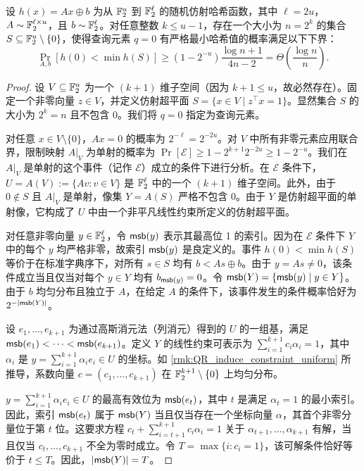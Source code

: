 \begin{theorem}\label{thm:min_wise_random_affine_not_good}
    设 $h(x) = Ax \oplus b$ 为从 $\mathbb{F}_2^u$ 到 $\mathbb{F}_2^\ell$ 的随机仿射哈希函数，其中 $\ell = 2u$，$A \sim \mathbb{F}_2^{\ell \times u}$，且 $b \sim \mathbb{F}_2^\ell$。对任意整数 $k \le u - 1$，存在一个大小为 $n = 2^k$ 的集合 $S \subseteq \mathbb{F}_2^u \setminus \{0\}$，使得查询元素 $q = 0$ 有严格最小哈希值的概率满足以下下界：
    $$
    \Pr_{A,b}[h(0) < \min h(S)] \ge (1 - 2^{-u}) \frac{\log n + 1}{4n - 2} = \Theta\left(\frac{\log n}{n}\right).
    $$
\end{theorem}

\begin{proof}
    设 $V \subseteq \mathbb{F}_2^u$ 为一个 $(k+1)$ 维子空间（因为 $k+1 \le u$，故必然存在）。固定一个非零向量 $z \in V$，并定义仿射超平面 $S = \{ x \in V \mid z^\top x = 1 \}$。显然集合 $S$ 的大小为 $2^k = n$ 且不包含 $0$。我们将 $q = 0$ 指定为查询元素。
    
    对任意 $x \in V \setminus \{0\}$，$Ax = 0$ 的概率为 $2^{-\ell} = 2^{-2u}$。对 $V$ 中所有非零元素应用联合界，限制映射 $A|_V$ 为单射的概率为 $\Pr[\mathcal{E}] \ge 1 - 2^{k+1} 2^{-2u} \ge 1 - 2^{-u}$。我们在 $A|_V$ 是单射的这个事件（记作 $\mathcal{E}$）成立的条件下进行分析。在 $\mathcal{E}$ 条件下，$U = A(V) := \{A v : v \in V\}$ 是 $\mathbb{F}_2^\ell$ 中的一个 $(k+1)$ 维子空间。此外，由于 $0 \notin S$ 且 $A|_V$ 是单射，像集 $Y = A(S)$ 严格不包含 $0$。由于 $Y$ 是仿射超平面的单射像，它构成了 $U$ 中由一个非平凡线性约束所定义的仿射超平面。
    
    对任意非零向量 $y \in \mathbb{F}_2^\ell$，令 $\mathsf{msb}(y)$ 表示其最高位 1 的索引。因为在 $\mathcal{E}$ 条件下 $Y$ 中的每个 $y$ 均严格非零，故索引 $\mathsf{msb}(y)$ 是良定义的。事件 $h(0) < \min h(S)$ 等价于在标准字典序下，对所有 $s \in S$ 均有 $b < As \oplus b$。由于 $y = As \neq 0$，该条件成立当且仅当对每个 $y \in Y$ 均有 $b_{\mathsf{msb}(y)} = 0$。令 $\mathsf{msb}(Y) = \{ \mathsf{msb}(y) \mid y \in Y \}$。由于 $b$ 均匀分布且独立于 $A$，在给定 $A$ 的条件下，该事件发生的条件概率恰好为 $2^{-|\mathsf{msb}(Y)|}$。
    
    设 $e_1, \dots, e_{k+1}$ 为通过高斯消元法（列消元）得到的 $U$ 的一组基，满足 $\mathsf{msb}(e_1) < \dots < \mathsf{msb}(e_{k+1})$。定义 $Y$ 的线性约束可表示为 $\sum_{i=1}^{k+1} c_i \alpha_i = 1$，其中 $\alpha_i$ 是 $y = \sum_{i=1}^{k+1} \alpha_i e_i \in U$ 的坐标。如 \cref{rmk:QR_induce_constraint_uniform} 所推导，系数向量 $c = (c_1, \dots, c_{k+1})$ 在 $\mathbb{F}_2^{k+1} \setminus \{0\}$ 上均匀分布。
    
    $y = \sum_{i = 1}^{k + 1} \alpha_i e_i \in U$ 的最高有效位为 $\mathsf{msb}(e_t)$，其中 $t$ 是满足 $\alpha_t = 1$ 的最小索引。因此，索引 $\mathsf{msb}(e_t)$ 属于 $\mathsf{msb}(Y)$ 当且仅当存在一个坐标向量 $\alpha$，其首个非零分量位于第 $t$ 位。这要求方程 $c_t + \sum_{i = t + 1}^{k + 1} c_i \alpha_i = 1$ 关于 $\alpha_{t + 1}, \dots, \alpha_{k + 1}$ 有解，当且仅当 $c_t, \dots, c_{k + 1}$ 不全为零时成立。令 $T = \max \{ i : c_i = 1 \}$，该可解条件恰好等价于 $t \le T$。因此，$|\mathsf{msb}(Y)| = T$。
    

\end{proof}
